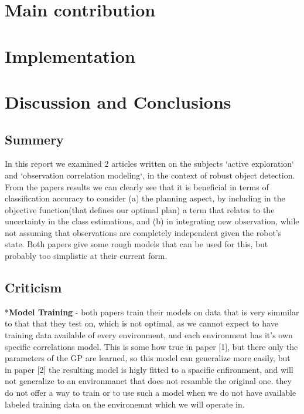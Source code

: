 \documentclass{article}
\begin{document}
	\section{Main contribution}
	\section{Implementation}
	
	\section{Discussion and Conclusions}
	\subsection{Summery}
	In this report we examined 2 articles written on the subjects `active exploration` and `observation correlation modeling`,
	in the context of robust object detection. From the papers results we can clearly see that it is beneficial in terms of classification accuracy to consider (a) the planning aspect, by including in the objective function(that defines our optimal plan) a term that relates to the uncertainty in the class estimations, and (b) in integrating new observation, while not assuming that observations are completely independent given the robot's state. Both papers give some rough models that can be used for this, but probably too simplistic at their current form.
	
	
	\subsection{Criticism}
	*\textbf{Model Training} - both papers train their models on data that is very simmilar to that that they test on, 
	which is not optimal, as we cannot expect to have training data available of every environment, and each environment has it's own specific correlations model. This is some how true in paper [1], but there only the parameters of the GP are learned, so this model can generalize more easily, but in paper [2] the resulting model is higly fitted to a spacific enfironment, and will not generalize to an environmanet that does not resamble the original one. they do not offer a way to train or to use such a model when we do not have available labeled training data on the environemnt which we will operate in. 	
	
\end{document}

